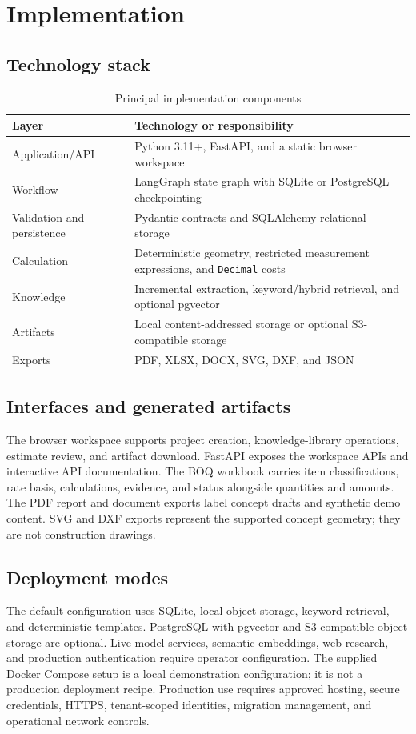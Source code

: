 \section{Implementation}
\subsection{Technology stack}
\begin{table}[htbp]
\centering
\caption{Principal implementation components}
\label{tab:stack}
\begin{tabularx}{\textwidth}{p{}X}
\toprule
\textbf{Layer} & \textbf{Technology or responsibility}\\
\midrule
Application/API & Python 3.11+, FastAPI, and a static browser workspace\\
Workflow & LangGraph state graph with SQLite or PostgreSQL checkpointing\\
Validation and persistence & Pydantic contracts and SQLAlchemy relational storage\\
Calculation & Deterministic geometry, restricted measurement expressions, and \texttt{Decimal} costs\\
Knowledge & Incremental extraction, keyword/hybrid retrieval, and optional pgvector\\
Artifacts & Local content-addressed storage or optional S3-compatible storage\\
Exports & PDF, XLSX, DOCX, SVG, DXF, and JSON\\
\bottomrule
\end{tabularx}
\end{table}

\subsection{Interfaces and generated artifacts}
The browser workspace supports project creation, knowledge-library operations, estimate review, and artifact download. FastAPI exposes the workspace APIs and interactive API documentation. The BOQ workbook carries item classifications, rate basis, calculations, evidence, and status alongside quantities and amounts. The PDF report and document exports label concept drafts and synthetic demo content. SVG and DXF exports represent the supported concept geometry; they are not construction drawings.

\subsection{Deployment modes}
The default configuration uses SQLite, local object storage, keyword retrieval, and deterministic templates. PostgreSQL with pgvector and S3-compatible object storage are optional. Live model services, semantic embeddings, web research, and production authentication require operator configuration. The supplied Docker Compose setup is a local demonstration configuration; it is not a production deployment recipe. Production use requires approved hosting, secure credentials, HTTPS, tenant-scoped identities, migration management, and operational network controls.

